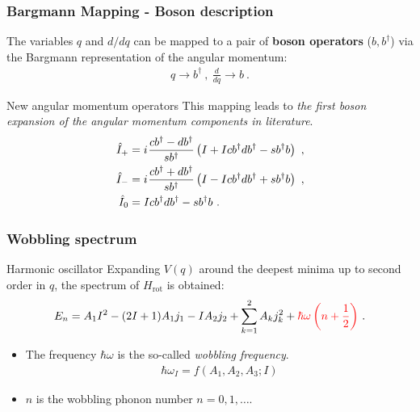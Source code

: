 \documentclass{beamer}
\newcommand{\iu}{{i\mkern1mu}}
\begin{document}
\begin{frame}
  \frametitle{Bargmann Mapping - Boson description}
The variables $q$ and $d/dq$ can be mapped to a pair of \textbf{boson operators} ($b,b^\dagger$) via the Bargmann representation of the angular momentum:
\begin{align}
  q\rightarrow b^\dagger\ ,\ \frac{d}{dq}\rightarrow b\ .
\end{align}
\begin{block}{New angular momentum operators}
  This mapping leads to \emph{the first boson expansion of the angular momentum components in literature}.
  \begin{align}
    \hat{I}_+&=\iu\frac{cb^\dagger-db^\dagger}{sb^\dagger}\left(I+Icb^\dagger db^\dagger-sb^\dagger b\right)\ ,\\
    \hat{I}_-&=\iu\frac{cb^\dagger+db^\dagger}{sb^\dagger}\left(I-Icb^\dagger db^\dagger+sb^\dagger b\right)\ ,\\
    \hat{I}_0&=Icb^\dagger db^\dagger-sb^\dagger b\ .
  \end{align}
\end{block}
\end{frame}

\begin{frame}
  \frametitle{Wobbling spectrum}
  \begin{exampleblock}{Harmonic oscillator}
    Expanding $V(q)$ around the deepest minima up to second order in $q$, the spectrum of $H_\text{rot}$ is obtained:
    \begin{align}
      E_n=A_1I^2-(2I+1)A_1j_1-IA_2j_2+\sum_{k=1}^2A_kj_k^2+{\color{red}\hbar\omega\left(n+\frac{1}{2}\right)}\ .
    \end{align}
  \end{exampleblock}
  \begin{itemize}
    \item The frequency $\hbar\omega$ is the so-called \emph{wobbling frequency}.
    \begin{align}
      \hbar\omega_I=f(A_1,A_2,A_3;I)  
    \end{align}
    \item $n$ is the wobbling phonon number $n=0,1,\dots$.
  \end{itemize}
\end{frame}
\end{document}
